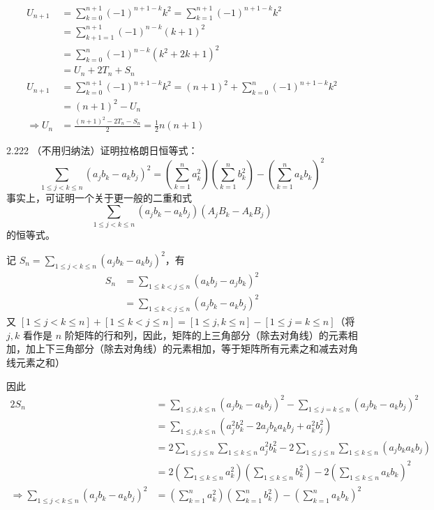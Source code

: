 \begin{align*}
  U_{n+1} &= \sum_{k=0}^{n+1} (-1)^{n+1-k} k^2 = \sum_{k=1}^{n+1} (-1)^{n+1-k} k^2 \\
  &= \sum_{k+1=1}^{n+1} (-1)^{n-k} (k + 1)^2 \\
  &= \sum_{k=0}^n (-1)^{n-k} (k^2 + 2k + 1)^2 \\
  &= U_n + 2 T_n + S_n \\
  U_{n+1} &= \sum_{k=0}^{n+1} (-1)^{n+1-k} k^2 = (n+1)^2 + \sum_{k=0}^n (-1)^{n+1-k} k^2 \\
  &= (n + 1)^2 - U_n \\
  \Rightarrow U_n &= \frac{(n+1)^2 - 2 T_n - S_n}{2} = \frac{1}{2} n (n + 1)
\end{align*}

\begin{problem}{2.22}{2}
  （不用归纳法）证明拉格朗日恒等式：
  \[
    \sum_{1 \leq j < k \leq n} (a_j b_k - a_k b_j)^2 = (\sum_{k=1}^n a_k^2) (\sum_{k=1}^n b_k^2) - (\sum_{k=1}^n a_k b_k)^2
  \]
  事实上，可证明一个关于更一般的二重和式
  \[
    \sum_{1 \leq j < k \leq n} (a_j b_k - a_k b_j) (A_j B_k - A_k B_j)
  \]
  的恒等式。
\end{problem}

记 \( S_n = \sum_{1 \leq j < k \leq n} (a_j b_k - a_k b_j)^2 \)，有
\begin{align*}
  S_n &= \sum_{1 \leq k < j \leq n} (a_k b_j - a_j b_k)^2 \\
  &=  \sum_{1 \leq k < j \leq n} (a_j b_k - a_k b_j)^2
\end{align*}
又 \( [1 \leq j < k \leq n] + [1 \leq k < j \leq n] = [1 \leq j, k \leq n] - [1 \leq j = k \leq n] \)（将 \( j, k \) 看作是 \( n \) 阶矩阵的行和列，因此，矩阵的上三角部分（除去对角线）的元素相加，加上下三角部分（除去对角线）的元素相加，等于矩阵所有元素之和减去对角线元素之和）

因此
\begin{align*}
  2 S_n &= \sum_{1 \leq j, k \leq n} (a_j b_k - a_k b_j)^2 - \sum_{1 \leq j = k \leq n} (a_j b_k - a_k b_j)^2 \\
  &= \sum_{1 \leq j, k \leq n} (a_j^2 b_k^2 - 2 a_j b_k a_k b_j + a_k^2 b_j^2) \\
  &= 2 \sum_{1 \leq j \leq n} \sum_{1 \leq k \leq n} a_j^2 b_k^2 - 2 \sum_{1 \leq j \leq n} \sum_{1 \leq k \leq n} (a_j b_k a_k b_j) \\
  &= 2(\sum_{1 \leq k \leq n} a_k^2)(\sum_{1 \leq k \leq n} b_k^2) - 2(\sum_{1 \leq k \leq n} a_k b_k)^2 \\
  \Rightarrow \sum_{1 \leq j < k \leq n} (a_j b_k - a_k b_j)^2 &= (\sum_{k=1}^n a_k^2)(\sum_{k=1}^n b_k^2) - (\sum_{k=1}^n a_k b_k)^2
\end{align*}

